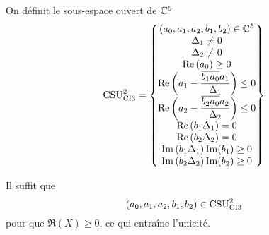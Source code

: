   \begin{defn}
    \label{def:csu:ci3-2}

    On définit le sous-espace ouvert de \(\CC^5\)
    \begin{equation*}
      \CSU[2]{CI3} = \left\lbrace 
      \begin{matrix}
      (a_0,a_1,a_2,b_1,b_2) \in \CC^5
      \\
      \Delta_1 \not = 0
      \\
      \Delta_2 \not = 0
      \\
      \Re\left(a_0\right)\ge 0
      \\
      \Re\left(a_1 - \frac{\conj{b_1a_0}a_1}{\Delta_1}\right) \le 0
      \\
      \Re\left(a_2 - \frac{\conj{b_2a_0}a_2}{\Delta_2}\right) \le 0
      \\
      \Re\left(b_1\Delta_1\right) = 0
      \\
      \Re\left(b_2\Delta_2\right) = 0
      \\
      \Im\left(b_1\Delta_1\right)\Im(b_1)\ge 0
      \\
      \Im\left(b_2\Delta_2\right)\Im(b_2)\ge 0
      \end{matrix}
      \right\rbrace
    \end{equation*}
  \end{defn}

  
 \begin{prop}
    \label{prop:csu:ci3-2}
    Il suffit que
    \begin{equation*}
      (a_0,a_1,a_2,b_1,b_2) \in \CSU[2]{CI3}
    \end{equation*}
    pour que \(\Re(X)\ge 0\), ce qui entraîne l'unicité.
  \end{prop}

